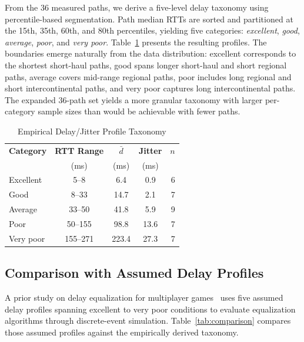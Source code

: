 \documentclass[conference]{IEEEtran}
\begin{document}
From the 36 measured paths, we derive a five-level delay taxonomy using percentile-based segmentation. Path median RTTs are sorted and partitioned at the 15th, 35th, 60th, and 80th percentiles, yielding five categories: \textit{excellent}, \textit{good}, \textit{average}, \textit{poor}, and \textit{very poor}. Table~\ref{tab:taxonomy} presents the resulting profiles. The boundaries emerge naturally from the data distribution: excellent corresponds to the shortest short-haul paths, good spans longer short-haul and short regional paths, average covers mid-range regional paths, poor includes long regional and short intercontinental paths, and very poor captures long intercontinental paths. The expanded 36-path set yields a more granular taxonomy with larger per-category sample sizes than would be achievable with fewer paths.

\begin{table}[t]
\caption{Empirical Delay/Jitter Profile Taxonomy}
\label{tab:taxonomy}
\begin{center}
\begin{tabular}{lcccr}
\toprule
\textbf{Category} & \textbf{RTT Range} & $\bar{d}$ & \textbf{Jitter} & $n$ \\
 & (ms) & (ms) & (ms) & \\
\midrule
Excellent & 5--8 & 6.4 & 0.9 & 6 \\
Good & 8--33 & 14.7 & 2.1 & 7 \\
Average & 33--50 & 41.8 & 5.9 & 9 \\
Poor & 50--155 & 98.8 & 13.6 & 7 \\
Very poor & 155--271 & 223.4 & 27.3 & 7 \\
\bottomrule
\end{tabular}
\end{center}
\end{table}

\subsection{Comparison with Assumed Delay Profiles}

A prior study on delay equalization for multiplayer games~\cite{companion} uses five assumed delay profiles spanning excellent to very poor conditions to evaluate equalization algorithms through discrete-event simulation. Table~\ref{tab:comparison} compares those assumed profiles against the empirically derived taxonomy.
\end{document}
